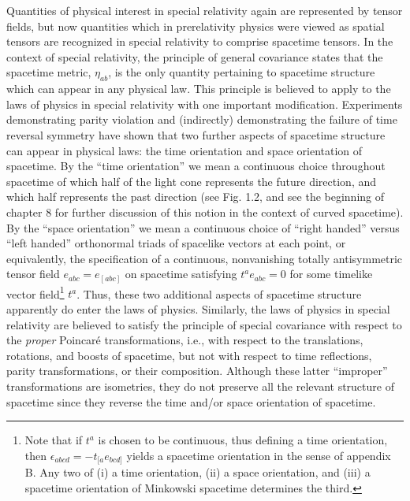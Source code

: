 Quantities of physical interest in special relativity again are represented by
tensor fields, but now quantities which in prerelativity physics were viewed as
spatial tensors are recognized in special relativity to comprise spacetime tensors.
In the context of special relativity, the principle of general covariance states that
the spacetime metric, \(\eta_{ab}\), is the only quantity pertaining to spacetime
structure which can appear in any physical law. This principle is believed to apply
to the laws of physics in special relativity with one important modification.
Experiments demonstrating parity violation and (indirectly) demonstrating the
failure of time reversal symmetry have shown that two further aspects of spacetime
structure can appear in physical laws: the time orientation and space orientation
of spacetime. By the \textquotedblleft time orientation\textquotedblright{} we
mean a continuous choice throughout spacetime of which half of the light cone
represents the future direction, and which half represents the past direction (see
Fig. 1.2, and see the beginning of chapter 8 for further discussion of this notion
in the context of curved spacetime). By the \textquotedblleft space
orientation\textquotedblright{} we mean a continuous choice of
\textquotedblleft right handed\textquotedblright{} versus \textquotedblleft left
handed\textquotedblright{} orthonormal triads of spacelike vectors at each point,
or equivalently, the specification of a continuous, nonvanishing totally
antisymmetric tensor field \(e_{abc}=e_{[abc]}\) on spacetime satisfying
\(t^ae_{abc}=0\) for some timelike vector field\footnote{Note that if \(t^a\)
is chosen to be continuous, thus defining a time orientation, then
\(\epsilon_{abcd}=-t_{[a}e_{bcd]}\) yields a spacetime orientation in the
sense of appendix B. Any two of (i) a time orientation, (ii) a space orientation,
and (iii) a spacetime orientation of Minkowski spacetime determines the third.}
\(t^a\). Thus, these two additional aspects of spacetime structure apparently do
enter the laws of physics. Similarly, the laws of physics in special relativity are
believed to satisfy the principle of special covariance with respect to the
\emph{proper} Poincar\'e transformations, i.e., with respect to the translations,
rotations, and boosts of spacetime, but not with respect to time reflections, parity
transformations, or their composition. Although these latter
\textquotedblleft improper\textquotedblright{} transformations are isometries,
they do not preserve all the relevant structure of spacetime since they reverse the
time and/or space orientation of spacetime.

